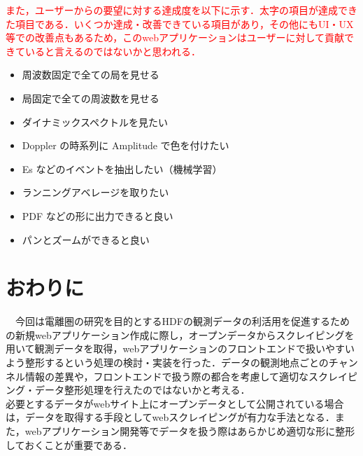 \textcolor{red}{また，ユーザーからの要望に対する達成度を以下に示す．太字の項目が達成できた項目である．いくつか達成・改善できている項目があり，その他にもUI・UX等での改善点もあるため，このwebアプリケーションはユーザーに対して貢献できていると言えるのではないかと思われる．}
\begin{itemize}
\item 周波数固定で全ての局を見せる
\item 局固定で全ての周波数を見せる
\item ダイナミックスペクトルを見たい
\item Doppler の時系列に Amplitude で色を付けたい
\item Es などのイベントを抽出したい（機械学習）
\item ランニングアベレージを取りたい
\item PDF などの形に出力できると良い
\item パンとズームができると良い
\end{itemize}

\section{おわりに}
　今回は電離圏の研究を目的とするHDFの観測データの利活用を促進するための新規webアプリケーション作成に際し，オープンデータからスクレイピングを用いて観測データを取得，webアプリケーションのフロントエンドで扱いやすいよう整形するという処理の検討・実装を行った．データの観測地点ごとのチャンネル情報の差異や，フロントエンドで扱う際の都合を考慮して適切なスクレイピング・データ整形処理を行えたのではないかと考える．\\
 必要とするデータがwebサイト上にオープンデータとして公開されている場合は，データを取得する手段としてwebスクレイピングが有力な手法となる．また，webアプリケーション開発等でデータを扱う際はあらかじめ適切な形に整形しておくことが重要である．\\
　

